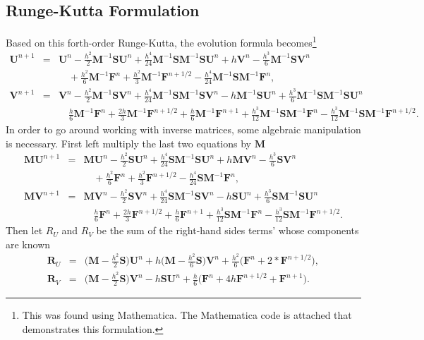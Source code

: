 \subsection{Runge-Kutta Formulation}
Based on this forth-order Runge-Kutta, the evolution formula becomes\footnote{This was found using Mathematica. The Mathematica code is attached that demonstrates this formulation.}
\begin{eqnarray*}
  \bm{U}^{n+1} & = & \bm{U}^n - \frac{h^2}{2}\bm{M}^{-1}\bm{SU}^n + \frac{h^4}{24}\bm{M}^{-1}\bm{S}\bm{M}^{-1}\bm{SU}^n + h\bm{V}^n - \frac{h^3}{6}\bm{M}^{-1}\bm{SV}^n \\
  & & \quad + \frac{h^2}{6}\bm{M}^{-1}\bm{F}^n + \frac{h^2}{3}\bm{M}^{-1}\bm{F}^{n+1/2} - \frac{h^4}{24}\bm{M}^{-1}\bm{S}\bm{M}^{-1}\bm{F}^n, \\
  \bm{V}^{n+1} & = & \bm{V}^n - \frac{h^2}{2}\bm{M}^{-1}\bm{SV}^n + \frac{h^4}{24}\bm{M}^{-1}\bm{S}\bm{M}^{-1}\bm{SV}^n - h\bm{M}^{-1}\bm{SU}^n + \frac{h^3}{6}\bm{M}^{-1}\bm{S}\bm{M}^{-1}\bm{SU}^n \\
  & & \quad \frac{h}{6}\bm{M}^{-1}\bm{F}^n + \frac{2h}{3}\bm{M}^{-1}\bm{F}^{n+1/2} + \frac{h}{6}\bm{M}^{-1}\bm{F}^{n+1} + \frac{h^3}{12}\bm{M}^{-1}\bm{S}\bm{M}^{-1}\bm{F}^n - \frac{h^3}{12}\bm{M}^{-1}\bm{S}\bm{M}^{-1}\bm{F}^{n+1/2}.
\end{eqnarray*}
In order to go around working with inverse matrices, some algebraic manipulation is necessary. First left multiply the last two equations by $\bm{M}$
\begin{eqnarray*}
  \bm{MU}^{n+1} & = & \bm{MU}^n - \frac{h^2}{2}\bm{SU}^n + \frac{h^4}{24}\bm{S}\bm{M}^{-1}\bm{SU}^n + h\bm{MV}^n - \frac{h^3}{6}\bm{SV}^n \\
  & & \quad + \frac{h^2}{6}\bm{F}^n + \frac{h^2}{3}\bm{F}^{n+1/2} - \frac{h^4}{24}\bm{S}\bm{M}^{-1}\bm{F}^n, \\
  \bm{MV}^{n+1} & = & \bm{MV}^n - \frac{h^2}{2}\bm{SV}^n + \frac{h^4}{24}\bm{S}\bm{M}^{-1}\bm{SV}^n - h\bm{SU}^n + \frac{h^3}{6}\bm{S}\bm{M}^{-1}\bm{SU}^n \\
  & & \quad \frac{h}{6}\bm{F}^n + \frac{2h}{3}\bm{F}^{n+1/2} + \frac{h}{6}\bm{F}^{n+1} + \frac{h^3}{12}\bm{S}\bm{M}^{-1}\bm{F}^n - \frac{h^3}{12}\bm{S}\bm{M}^{-1}\bm{F}^{n+1/2}.
\end{eqnarray*}
Then let $R_U$ and $R_V$ be the sum of the right-hand sides terms' whose components are known
\begin{eqnarray*}
  \bm{R}_U & = & \bigg(\bm{M}-\frac{h^2}{2}\bm{S}\bigg)\bm{U}^n + h\bigg(\bm{M}-\frac{h^2}{6}\bm{S}\bigg)\bm{V}^n + \frac{h^2}{6}\bigg(\bm{F}^n+2*\bm{F}^{n+1/2}\bigg), \\
  \bm{R}_V  & = & \bigg(\bm{M}-\frac{h^2}{2}\bm{S}\bigg)\bm{V}^n - h\bm{SU}^n + \frac{h}{6}\bigg(\bm{F}^n+4h\bm{F}^{n+1/2}+\bm{F}^{n+1}\bigg).
\end{eqnarray*}

